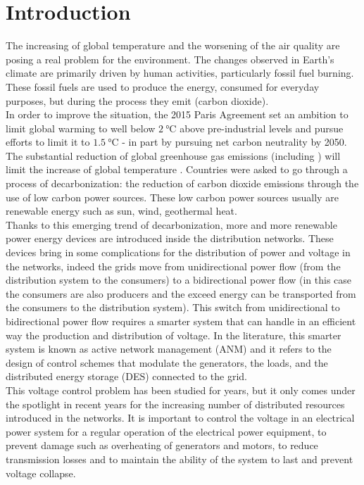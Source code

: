 \chapter{Introduction}
The increasing of global temperature and the worsening of the air quality are posing a real problem for the environment. The changes observed in Earth’s climate are primarily driven by human activities, particularly fossil fuel burning. These fossil fuels are used to produce the energy, consumed for everyday purposes, but during the process they emit  (carbon dioxide).\\
In order to improve the situation, the 2015 Paris Agreement set an ambition to limit global warming to well below $\SI{2}{\degreeCelsius}$ above pre-industrial levels and pursue efforts to limit it to $\SI{1.5}{\degreeCelsius}$ - in part by pursuing net carbon neutrality by 2050. The substantial reduction of global greenhouse gas emissions (including )  will limit the increase of global temperature \cite{french_conference}. Countries were asked to go through a process of decarbonization: the reduction of carbon dioxide emissions through the use of low carbon power sources. These low carbon power sources usually are renewable energy such as sun, wind, geothermal heat. \\
Thanks to this emerging trend of decarbonization, more and more renewable power energy devices are introduced inside the distribution networks. These devices bring in some complications for the distribution of power and voltage in the networks, indeed the grids move from unidirectional power flow (from the distribution system to the consumers) to a bidirectional power flow (in this case the consumers are also producers and the exceed energy can be transported from the consumers to the distribution system). This switch from unidirectional to bidirectional power flow requires a smarter system that can handle in an efficient way the production and distribution of voltage. In the literature, this smarter system is known as active network management (\gls{ANM}) and it refers to the design of control schemes that modulate the generators, the loads, and the distributed energy storage (\gls{DES}) connected to the grid. \\
This voltage control problem has been studied for years, but it only comes under the spotlight in recent years for the increasing number of distributed resources introduced in the networks. It is important to control the voltage in an electrical power system for a regular operation of the electrical power equipment, to prevent damage such as overheating of generators and motors, to reduce transmission losses and to maintain the ability of the system to last and prevent voltage collapse.
